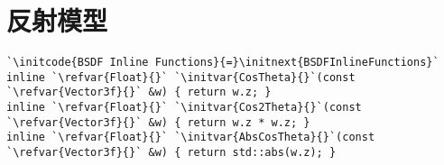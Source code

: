 \chapter{反射模型}\label{chap:反射模型}

\begin{lstlisting}
`\initcode{BSDF Inline Functions}{=}\initnext{BSDFInlineFunctions}`
inline `\refvar{Float}{}` `\initvar{CosTheta}{}`(const `\refvar{Vector3f}{}` &w) { return w.z; }
inline `\refvar{Float}{}` `\initvar{Cos2Theta}{}`(const `\refvar{Vector3f}{}` &w) { return w.z * w.z; }
inline `\refvar{Float}{}` `\initvar{AbsCosTheta}{}`(const `\refvar{Vector3f}{}` &w) { return std::abs(w.z); }
\end{lstlisting}


